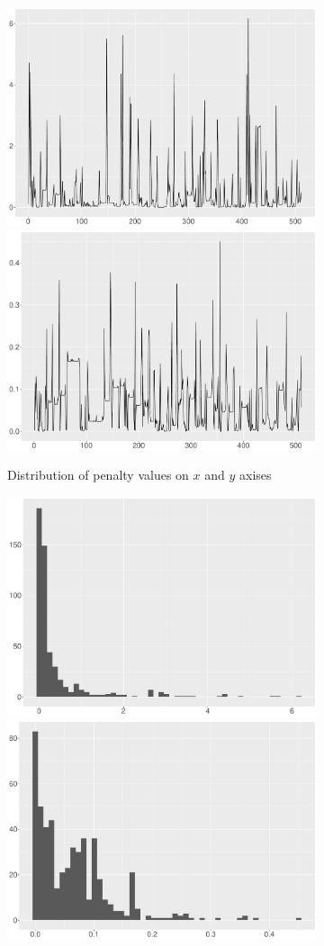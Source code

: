 \begin{figure}
    \centering
    \begin{subfigure}{\textwidth}
    \centering
    \includegraphics[width=0.45\linewidth]{Chapters/02TractorSplineTheory/plot/ggplot/ggRealdataXPenaltyLine.pdf}
    \includegraphics[width=0.45\linewidth]{Chapters/02TractorSplineTheory/plot/ggplot/ggRealdataYPenaltyLine.pdf}
    \caption{Distribution of penalty values on $x$ and $y$ axises}\label{penaltyxyggXYLine}
    \end{subfigure}
    \begin{subfigure}{\textwidth}
    \centering
    \includegraphics[width=0.45\linewidth]{Chapters/02TractorSplineTheory/plot/ggplot/ggRealdataXPenaltyHist.pdf}
    \includegraphics[width=0.45\linewidth]{Chapters/02TractorSplineTheory/plot/ggplot/ggRealdataYPenaltyHist.pdf}

\end{subfigure}
\end{figure}
